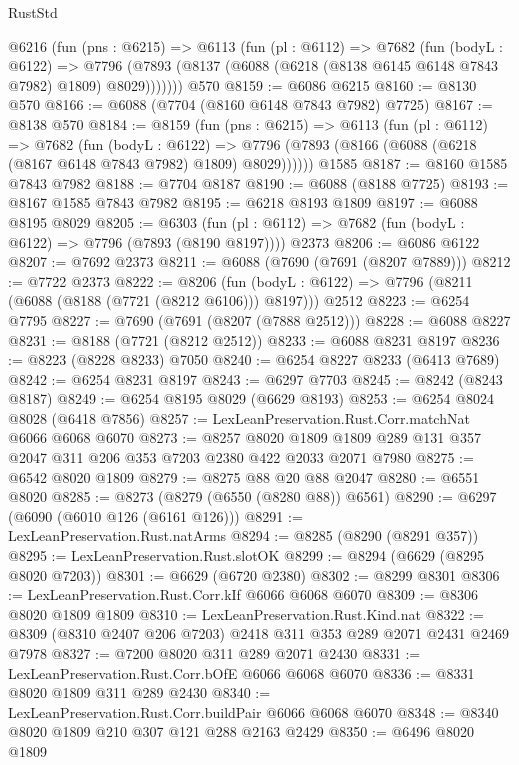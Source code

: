 \begin{lexlean}{RustStd}
\begin{coremodule}
    @6216
      (fun (pns : @6215) =>
      @6113
        (fun (pl : @6112) =>
        @7682
          (fun (bodyL : @6122) =>
          @7796 (@7893 (@8137 (@6088 (@6218 (@8138 @6145 @6148 @7843 @7982) @1809) @8029)))))))
    @570
@8159 := @6086 @6215
@8160 := @8130 @570
@8166 := @6088 (@7704 (@8160 @6148 @7843 @7982) @7725)
@8167 := @8138 @570
@8184 := @8159
    (fun (pns : @6215) =>
    @6113
      (fun (pl : @6112) =>
      @7682
        (fun (bodyL : @6122) =>
        @7796 (@7893 (@8166 (@6088 (@6218 (@8167 @6148 @7843 @7982) @1809) @8029))))))
    @1585
@8187 := @8160 @1585 @7843 @7982
@8188 := @7704 @8187
@8190 := @6088 (@8188 @7725)
@8193 := @8167 @1585 @7843 @7982
@8195 := @6218 @8193 @1809
@8197 := @6088 @8195 @8029
@8205 := @6303
    (fun (pl : @6112) => @7682 (fun (bodyL : @6122) => @7796 (@7893 (@8190 @8197))))
    @2373
@8206 := @6086 @6122
@8207 := @7692 @2373
@8211 := @6088 (@7690 (@7691 (@8207 @7889)))
@8212 := @7722 @2373
@8222 := @8206
    (fun (bodyL : @6122) => @7796 (@8211 (@6088 (@8188 (@7721 (@8212 @6106))) @8197)))
    @2512
@8223 := @6254 @7795
@8227 := @7690 (@7691 (@8207 (@7888 @2512)))
@8228 := @6088 @8227
@8231 := @8188 (@7721 (@8212 @2512))
@8233 := @6088 @8231 @8197
@8236 := @8223 (@8228 @8233) @7050
@8240 := @6254 @8227 @8233 (@6413 @7689)
@8242 := @6254 @8231 @8197
@8243 := @6297 @7703
@8245 := @8242 (@8243 @8187)
@8249 := @6254 @8195 @8029 (@6629 @8193)
@8253 := @6254 @8024 @8028 (@6418 @7856)
@8257 := LexLeanPreservation.Rust.Corr.matchNat @6066 @6068 @6070
@8273 := @8257
    @8020
    @1809
    @1809
    @289
    @131
    @357
    @2047
    @311
    @206
    @353
    @7203
    @2380
    @422
    @2033
    @2071
    @7980
@8275 := @6542 @8020 @1809
@8279 := @8275 @88 @20 @88 @2047
@8280 := @6551 @8020
@8285 := @8273 (@8279 (@6550 (@8280 @88)) @6561)
@8290 := @6297 (@6090 (@6010 @126 (@6161 @126)))
@8291 := LexLeanPreservation.Rust.natArms
@8294 := @8285 (@8290 (@8291 @357))
@8295 := LexLeanPreservation.Rust.slotOK
@8299 := @8294 (@6629 (@8295 @8020 @7203))
@8301 := @6629 (@6720 @2380)
@8302 := @8299 @8301
@8306 := LexLeanPreservation.Rust.Corr.kIf @6066 @6068 @6070
@8309 := @8306 @8020 @1809 @1809
@8310 := LexLeanPreservation.Rust.Kind.nat
@8322 := @8309 (@8310 @2407 @206 @7203) @2418 @311 @353 @289 @2071 @2431 @2469 @7978
@8327 := @7200 @8020 @311 @289 @2071 @2430
@8331 := LexLeanPreservation.Rust.Corr.bOfE @6066 @6068 @6070
@8336 := @8331 @8020 @1809 @311 @289 @2430
@8340 := LexLeanPreservation.Rust.Corr.buildPair @6066 @6068 @6070
@8348 := @8340 @8020 @1809 @210 @307 @121 @288 @2163 @2429
@8350 := @6496 @8020 @1809

\end{coremodule}
\end{lexlean}
